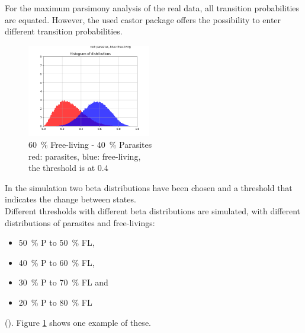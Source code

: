       For the maximum parsimony analysis of the real data, all transition probabilities are equated.
        However, the used castor package \cite{Louca2017} offers the possibility to enter different 
        transition probabilities.
      \begin{figure}
        \begin{center}
          \includegraphics[trim = 0mm 0mm 0mm 13mm, clip, width=0.48\textwidth]{Figures/40-60.png}
        \end{center}
        \caption{60~\% Free-living - 40~\% Parasites \\ red: parasites, blue: free-living, \\ the threshold is at 0.4}
        \label{fig:Beta distribution}
      \end{figure}

      In the simulation two beta distributions have been chosen and a threshold that indicates the change 
        between states. \\
      Different thresholds with different beta distributions are simulated, with different distributions 
        of parasites and free-livings:
        \begin{itemize}
          \item 50~\% P to 50~\% FL,
          \item 40~\% P to 60~\% FL,
          \item 30~\% P to 70~\% FL and 
          \item 20~\% P to 80~\% FL
        \end{itemize}
        (). Figure \ref{fig:Beta distribution} 
        shows one example of these. \\


